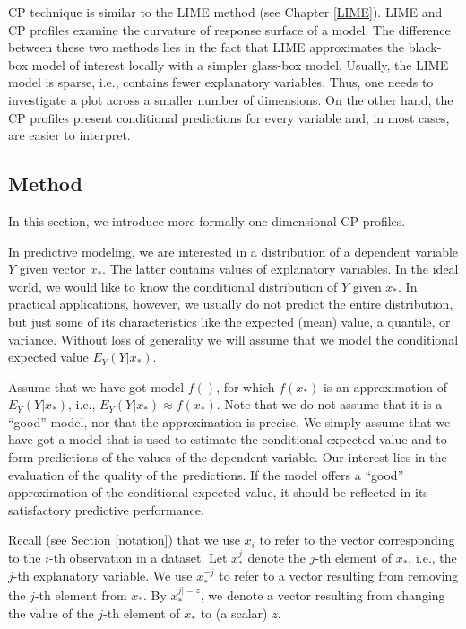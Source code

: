 \documentclass[12pt,]{krantz}
\theoremstyle{definition}
\theoremstyle{definition}
\theoremstyle{definition}
\theoremstyle{remark}
\begin{document}
CP technique is similar to the LIME method (see Chapter \ref{LIME}).
LIME and CP profiles examine the curvature of response surface of a
model. The difference between these two methods lies in the fact that
LIME approximates the black-box model of interest locally with a simpler
glass-box model. Usually, the LIME model is sparse, i.e., contains fewer
explanatory variables. Thus, one needs to investigate a plot across a
smaller number of dimensions. On the other hand, the CP profiles present
conditional predictions for every variable and, in most cases, are
easier to interpret.

\hypertarget{CPMethod}{%
\subsection{Method}\label{CPMethod}}

In this section, we introduce more formally one-dimensional CP profiles.

In predictive modeling, we are interested in a distribution of a
dependent variable \(Y\) given vector \(x_*\). The latter contains
values of explanatory variables. In the ideal world, we would like to
know the conditional distribution of \(Y\) given \(x_*\). In practical
applications, however, we usually do not predict the entire
distribution, but just some of its characteristics like the expected
(mean) value, a quantile, or variance. Without loss of generality we
will assume that we model the conditional expected value
\(E_Y(Y | x_*)\).

Assume that we have got model \(f()\), for which \(f(x_*)\) is an
approximation of \(E_Y(Y | x_*)\), i.e.,
\(E_Y(Y | x_*) \approx f(x_*)\). Note that we do not assume that it is a
``good'' model, nor that the approximation is precise. We simply assume
that we have got a model that is used to estimate the conditional
expected value and to form predictions of the values of the dependent
variable. Our interest lies in the evaluation of the quality of the
predictions. If the model offers a ``good'' approximation of the
conditional expected value, it should be reflected in its satisfactory
predictive performance.

Recall (see Section \ref{notation}) that we use \(x_i\) to refer to the
vector corresponding to the \(i\)-th observation in a dataset. Let
\(x^{j}_{*}\) denote the \(j\)-th element of \(x_{*}\), i.e., the
\(j\)-th explanatory variable. We use \(x^{-j}_{*}\) to refer to a
vector resulting from removing the \(j\)-th element from \(x_{*}\). By
\(x^{j|=z}_{*}\), we denote a vector resulting from changing the value
of the \(j\)-th element of \(x_{*}\) to (a scalar) \(z\).
\end{document}
